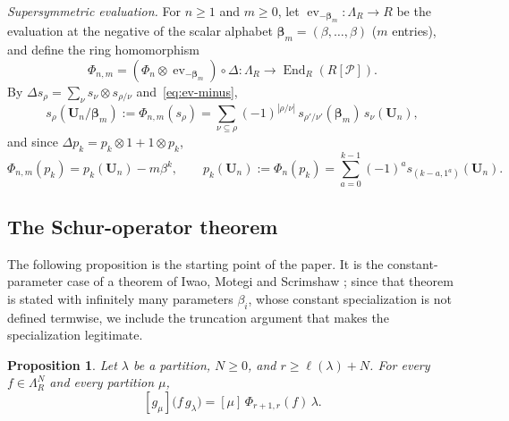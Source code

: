 \documentclass[11pt]{amsart}
\numberwithin{equation}{section}
\newtheorem{proposition}[theorem]{Proposition}
\theoremstyle{definition}
\theoremstyle{remark}
\newcommand{\Lam}{\Lambda}
\newcommand{\Par}{\mathcal P}
\newcommand{\ev}{\operatorname{ev}}
\newcommand{\bfU}{\mathbf U}
\newcommand{\bbeta}{\boldsymbol\beta}
\begin{document}
\emph{Supersymmetric evaluation.} For $n\geq1$ and $m\geq0$, let
$\ev_{-\bbeta_m}\colon\Lam_R\to R$ be the evaluation at the negative of the
scalar alphabet $\bbeta_m=(\beta,\dots,\beta)$ ($m$ entries), and define the
ring homomorphism
\begin{equation}\label{eq:Phi-super}
 \Phi_{n,m}=(\Phi_n\otimes\ev_{-\bbeta_m})\circ\Delta\colon
 \Lam_R\to\operatorname{End}_R(R[\Par]).
\end{equation}
By $\Delta s_\rho=\sum_\nu s_\nu\otimes s_{\rho/\nu}$ and~\eqref{eq:ev-minus},
\begin{equation}\label{eq:super-schur}
 s_\rho(\bfU_n/\bbeta_m):=\Phi_{n,m}(s_\rho)
 =\sum_{\nu\subseteq\rho}(-1)^{|\rho/\nu|}\,s_{\rho'/\nu'}(\bbeta_m)\,s_\nu(\bfU_n),
\end{equation}
and since $\Delta p_k=p_k\otimes1+1\otimes p_k$,
\begin{equation}\label{eq:superpower}
 \Phi_{n,m}(p_k)=p_k(\bfU_n)-m\beta^k,
 \qquad
 p_k(\bfU_n):=\Phi_n(p_k)=\sum_{a=0}^{k-1}(-1)^as_{(k-a,1^a)}(\bfU_n).
\end{equation}

\subsection{The Schur-operator theorem}\label{subsec:IMS}

The following proposition is the starting point of the paper. It is the
constant-parameter case of a theorem of Iwao, Motegi and Scrimshaw \cite{IMS25}; since
that theorem is stated with infinitely many parameters $\beta_i$, whose
constant specialization is not defined termwise, we include the truncation
argument that makes the specialization legitimate.

\begin{proposition}\label{prop:operator-action}
Let $\lambda$ be a partition, $N\geq0$, and $r\geq\ell(\lambda)+N$. For every
$f\in\Lam^N_R$ and every partition $\mu$,
\[
 [g_\mu]\bigl(f\,g_\lambda\bigr)=[\mu]\,\Phi_{r+1,r}(f)\,\lambda .
\]
\end{proposition}
\end{document}
